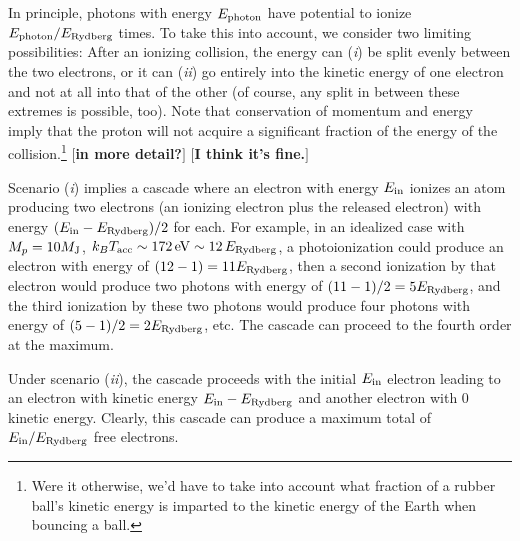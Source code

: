 \documentclass[iop,numberedappendix,apj]{emulateapj}
\def\memoYF#1{\color{red}$[${\bf #1}$]$ \color{black}}
\def\memoDS#1{\color{blue}$[${\bf #1}$]$ \color{black}}
\begin{document}
In principle, photons with energy $E_{\rm photon}$ have potential to ionize $E_{\rm photon}/E_{\rm Rydberg}$ times.
To take this into account, we consider two limiting possibilities:
After an ionizing collision, the energy can (\emph{i}) be split evenly between the two electrons, or it can (\emph{ii}) go entirely into the kinetic energy of one electron and not at all into that of the other (of course, any split in between these extremes is possible, too).
Note that conservation of momentum and energy imply that the proton will not acquire a significant fraction of the energy of the collision.\footnote{Were it otherwise, we'd have to take into account what fraction of a rubber ball's kinetic energy is imparted to the kinetic energy of the Earth when bouncing a ball.}  \memoYF{in more detail?} \memoDS{I think it's fine.}

Scenario (\emph{i}) implies a cascade where an electron with energy $E_{\rm in}$ ionizes an atom producing two electrons (an ionizing electron plus the released electron) with energy $ ( E_{\rm in} - E_{\rm Rydberg} ) /2 $ for each.
For example, in an idealized case with $M_p = 10 M_{\rm J}$, $k_B T_{\rm acc} \sim 172\,{\rm eV} \sim 12 \, E_{\rm Rydberg}$, a photoionization could produce an electron with energy of $(12-1) = 11 E_{\rm Rydberg} $, then a second ionization by that electron would produce two photons with energy of $(11-1)/2 = 5 E_{\rm Rydberg}$, and the third ionization by these two photons would produce four photons with energy of $(5-1)/2 = 2 E_{\rm Rydberg}$, etc.
The cascade can proceed to the fourth order at the maximum.

Under scenario (\emph{ii}), the cascade proceeds with the initial $E_{\rm in}$ electron leading to an electron with kinetic energy $E_{\rm in} - E_{\rm Rydberg}$ and another electron with 0 kinetic energy.
Clearly, this cascade can produce a maximum total of $E_{\rm in} / E_{\rm Rydberg}$ free electrons.
\end{document}
